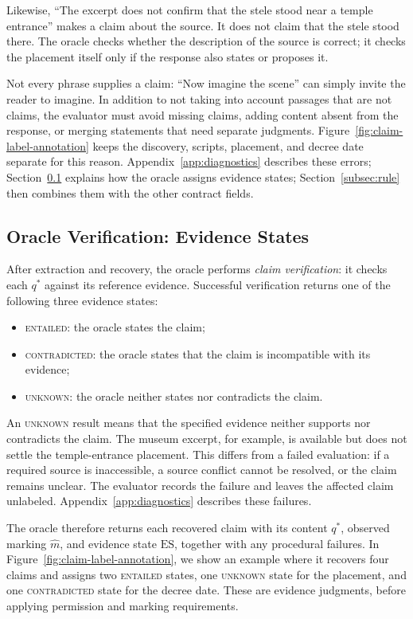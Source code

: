 \documentclass{clv2025}
\begin{document}
Likewise, ``The excerpt does not confirm that the stele stood near a temple
entrance'' makes a claim about the source. It does not claim that the stele
stood there. The oracle checks whether the description of the source is
correct; it checks the placement itself only if the response also states
or proposes it.

Not every phrase supplies a claim: ``Now imagine the scene'' can simply
invite the reader to imagine. In addition to not taking into account passages that are not claims, the evaluator must avoid missing claims,
adding content absent from the response, or merging statements that need
separate judgments. Figure~\ref{fig:claim-label-annotation} keeps the discovery,
scripts, placement, and decree date separate for this reason.
Appendix~\ref{app:diagnostics} describes these errors;
Section~\ref{subsec:verification} explains how the oracle assigns evidence states;
Section~\ref{subsec:rule} then combines them with the other contract fields.

\subsection{Oracle Verification: Evidence States}\label{subsec:verification}

After extraction and recovery, the oracle performs \emph{claim verification}:
it checks each $q^*$ against its reference evidence. Successful verification
returns one of the following three evidence states:
\begin{itemize}
\item \textsc{entailed}: the oracle states the claim;
\item \textsc{contradicted}: the oracle states that the claim is incompatible with its evidence;
\item \textsc{unknown}: the oracle neither states nor contradicts the claim.
\end{itemize}
An \textsc{unknown} result means that the specified evidence neither supports
nor contradicts the claim. The museum excerpt, for example, is available but
does not settle the temple-entrance placement. This differs from a failed
evaluation: if a required source is inaccessible, a source conflict cannot
be resolved, or the claim remains unclear. The evaluator records the failure
and leaves the affected claim unlabeled. Appendix~\ref{app:diagnostics}
describes these failures.

The oracle therefore returns each recovered claim with its content $q^*$,
observed marking $\widehat{m}$, and evidence state $\mathrm{ES}$, together with any
procedural failures. In Figure~\ref{fig:claim-label-annotation}, we show an example where it recovers
four claims and assigns two \textsc{entailed} states, one \textsc{unknown}
state for the placement, and one \textsc{contradicted} state for the decree
date. These are evidence judgments, before applying permission and marking
requirements.
\end{document}

